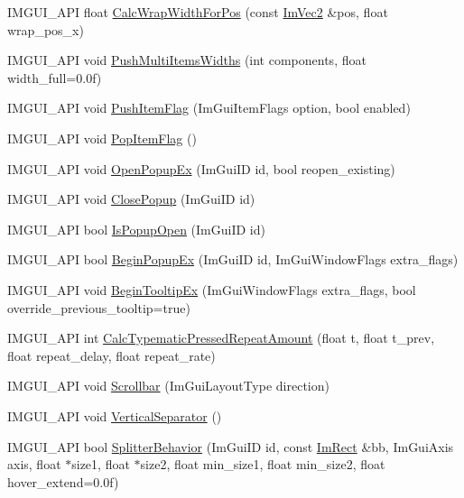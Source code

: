 \begin{DoxyCompactItemize}
\item 
I\+M\+G\+U\+I\+\_\+\+A\+PI float \hyperlink{namespace_im_gui_a66416151e58c34cd02973976de66e0e9}{Calc\+Wrap\+Width\+For\+Pos} (const \hyperlink{struct_im_vec2}{Im\+Vec2} \&pos, float wrap\+\_\+pos\+\_\+x)
\item 
I\+M\+G\+U\+I\+\_\+\+A\+PI void \hyperlink{namespace_im_gui_ab913605fcf6d405d102cdf56cd414a5a}{Push\+Multi\+Items\+Widths} (int components, float width\+\_\+full=0.\+0f)
\item 
I\+M\+G\+U\+I\+\_\+\+A\+PI void \hyperlink{namespace_im_gui_ac7301f6378333f6d17f47823eed9e00a}{Push\+Item\+Flag} (Im\+Gui\+Item\+Flags option, bool enabled)
\item 
I\+M\+G\+U\+I\+\_\+\+A\+PI void \hyperlink{namespace_im_gui_aa93281155e1dd23715dbd384e91edc6b}{Pop\+Item\+Flag} ()
\item 
I\+M\+G\+U\+I\+\_\+\+A\+PI void \hyperlink{namespace_im_gui_a92683a696319581577334d6b798e2f97}{Open\+Popup\+Ex} (Im\+Gui\+ID id, bool reopen\+\_\+existing)
\item 
I\+M\+G\+U\+I\+\_\+\+A\+PI void \hyperlink{namespace_im_gui_a7f3f82fc44d67af554faf104b913ea55}{Close\+Popup} (Im\+Gui\+ID id)
\item 
I\+M\+G\+U\+I\+\_\+\+A\+PI bool \hyperlink{namespace_im_gui_ae747d8e0c6ff9c24535e9d07e9350397}{Is\+Popup\+Open} (Im\+Gui\+ID id)
\item 
I\+M\+G\+U\+I\+\_\+\+A\+PI bool \hyperlink{namespace_im_gui_a89da3a22300e8293257b6cfdf1b83b7a}{Begin\+Popup\+Ex} (Im\+Gui\+ID id, Im\+Gui\+Window\+Flags extra\+\_\+flags)
\item 
I\+M\+G\+U\+I\+\_\+\+A\+PI void \hyperlink{namespace_im_gui_a3189530b7795a9b99169eb95f36c516d}{Begin\+Tooltip\+Ex} (Im\+Gui\+Window\+Flags extra\+\_\+flags, bool override\+\_\+previous\+\_\+tooltip=true)
\item 
I\+M\+G\+U\+I\+\_\+\+A\+PI int \hyperlink{namespace_im_gui_ad3af0fc327467a44116d7d04018b9124}{Calc\+Typematic\+Pressed\+Repeat\+Amount} (float t, float t\+\_\+prev, float repeat\+\_\+delay, float repeat\+\_\+rate)
\item 
I\+M\+G\+U\+I\+\_\+\+A\+PI void \hyperlink{namespace_im_gui_abf1d7a83c5f0a555bbe7f831b0319c8a}{Scrollbar} (Im\+Gui\+Layout\+Type direction)
\item 
I\+M\+G\+U\+I\+\_\+\+A\+PI void \hyperlink{namespace_im_gui_ae60f7b8ece8808c477796e6594c8d796}{Vertical\+Separator} ()
\item 
I\+M\+G\+U\+I\+\_\+\+A\+PI bool \hyperlink{namespace_im_gui_aea5c03e6650bb824fc73aa0b3493df52}{Splitter\+Behavior} (Im\+Gui\+ID id, const \hyperlink{struct_im_rect}{Im\+Rect} \&bb, Im\+Gui\+Axis axis, float $\ast$size1, float $\ast$size2, float min\+\_\+size1, float min\+\_\+size2, float hover\+\_\+extend=0.\+0f)

\end{DoxyCompactItemize}
